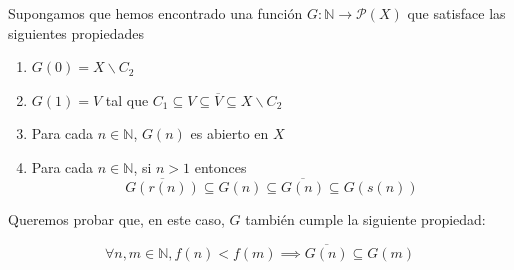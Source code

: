 \documentclass{article}
\newcommand{\nat}{\mathbb{N}}
\begin{document}
Supongamos que hemos encontrado una función $G : \nat \to \mathcal{P}(X)$ que satisface las siguientes propiedades

\begin{enumerate}
  \item $G(0) = X \backslash C_2$
  \item $G(1) = V$ tal que $C_1 \subseteq V \subseteq \overline{V} \subseteq X \backslash C_2$
  \item Para cada $n \in \nat $, $G(n)$ es abierto en $X$
  \item Para cada $n \in \nat$, si $n>1$ entonces \begin{equation} \label{cond_Grs} \overline{G(r(n))} \subseteq G(n) \subseteq \overline{G(n)} \subseteq G(s(n)) \end{equation}
\end{enumerate}

Queremos probar que, en este caso, $G$ también cumple la siguiente propiedad:

\begin{equation} \label{cond_G}
  \forall n, m \in \nat, f(n) < f(m) \implies \overline{G(n)} \subseteq G(m)
\end{equation}
\end{document}
